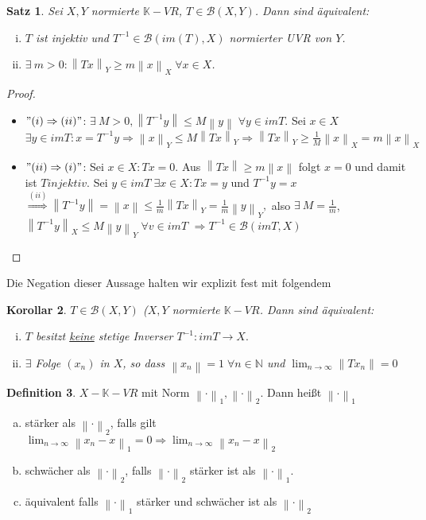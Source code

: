 \documentclass[ngerman]{report}
\theoremstyle{plain}%
\newtheorem{thm}{Satz}[chapter]
\newtheorem{cor}[thm]{Korollar}
\theoremstyle{definition}%
\newtheorem{definition}[thm]{Definition}
\theoremstyle{myStyle}
\newcommand{\N}{\mathbb{N}}
\newcommand{\K}{\mathbb{K}}
\newcommand{\B}{\mathcal{B}} %
\newcommand{\BS}[1][X,Y]{\mathcal{B}(#1)} %
\newcommand{\norm}[1]{\left \|#1\right\| }
\newcommand{\df}[1][]{%
	\overset{#1}{\Rightarrow}
}
\newcommand{\limes}[1][\infty]{\lim_{n \to #1}}
\newcommand{\inv}[1]{#1^{-1}}
\newcommand{\disp}{\displaystyle}
\newcommand{\qmarks}[1]{#1}
\begin{document}
	\begin{thm}
		Sei $X,Y$ normierte $\K-VR$, $T\in \BS$. Dann sind äquivalent:
			\begin{enumerate}[(i)]
				\item $T$ ist injektiv und $\inv{T} \in\B(im(T), X)$ normierter UVR von $Y$.
				\item $\exists \: m > 0: \norm{Tx}_Y \geq m\norm{x}_X \; \forall x\in X$.
			\end{enumerate}
	\end{thm}
	\begin{proof}
		\begin{itemize}[]
			\item $"(i)\df (ii)"$: $\exists \: M>0, \norm{\inv{T}y} \leq M\norm{y} \; \forall y\in imT.$
				Sei $x\in X$ $\exists y\in imT: x = \inv{T}y \df \norm{x}_Y \leq M \norm{Tx}_Y 
				\df \norm{Tx}_Y \geq \frac{1}{M} \norm{x}_X = m\norm{x}_X$
			\item $"(ii) \df (i)"$: Sei $x\in X: Tx = 0$.
				Aus $\norm{Tx} \geq m \norm{x}$ folgt $x = 0$ und damit ist $T injektiv$.
				Sei $y\in imT \; \exists x\in X: Tx = y$ und $\inv{T}y = x $
				$\df[(ii)] \norm{\inv{T}y} = \norm{x} \leq \frac{1}{m} \norm{Tx}_Y = \frac{1}{m} \norm{y}_Y,$
				also $\exists\: M = \frac{1}{m}$, $\norm{\inv{T}y}_X \leq M\norm{y}_Y \; \forall v\in imT$
				$\df \inv{T} \in \B(imT,X)$
		\end{itemize}
	\end{proof}

Die Negation dieser Aussage halten wir explizit fest mit folgendem 
	\begin{cor}
		$T \in \BS$ ($X,Y$ normierte $\K-VR$. Dann sind äquivalent:
			\begin{enumerate}[(i)]
				\item $T$ besitzt \underline{keine} stetige Inverser 
					$\inv{T} : imT\to X.$
				\item $\exists$ Folge $(x_n)$ in $X$, so dass $\norm{x_n} = 1 \; \forall n\in \N$
					und $\disp \limes \norm{T x_n} = 0$
			\end{enumerate}
	\end{cor}

	\begin{definition}
		$X-\K-VR$ mit Norm $\norm{\cdot}_1,\norm{\cdot}_2$. Dann heißt $\norm{\cdot}_1$ 
			\begin{enumerate}[(a)]
				\item \qmarks{stärker} als $\norm{\cdot}_2$, falls gilt
					$\disp \limes \norm{x_n - x}_1 = 0 \df \limes \norm{x_n - x}_2$
				\item \qmarks{schwächer} als $\norm{\cdot}_2$, falls $\norm{\cdot}_2$ stärker ist als $\norm{\cdot}_1$.
				\item \qmarks{äquivalent} falls $\norm{\cdot}_1$ stärker und schwächer ist als $\norm{\cdot}_2$
			\end{enumerate}
	\end{definition}
\end{document}
